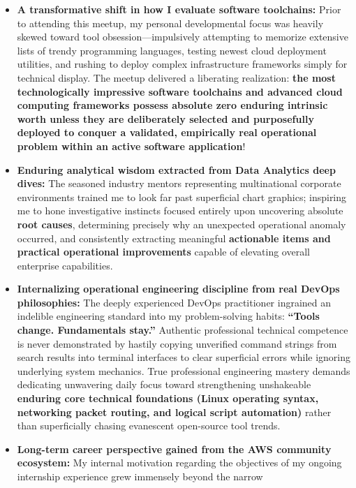 \begin{itemize}
\tightlist
\item
  \textbf{A transformative shift in how I evaluate software toolchains:}
  Prior to attending this meetup, my personal developmental focus was
  heavily skewed toward tool obsession---impulsively attempting to
  memorize extensive lists of trendy programming languages, testing
  newest cloud deployment utilities, and rushing to deploy complex
  infrastructure frameworks simply for technical display. The meetup
  delivered a liberating realization: \textbf{the most technologically
  impressive software toolchains and advanced cloud computing frameworks
  possess absolute zero enduring intrinsic worth unless they are
  deliberately selected and purposefully deployed to conquer a
  validated, empirically real operational problem within an active
  software application}!
\item
  \textbf{Enduring analytical wisdom extracted from Data Analytics deep
  dives:} The seasoned industry mentors representing multinational
  corporate environments trained me to look far past superficial chart
  graphics; inspiring me to hone investigative instincts focused
  entirely upon uncovering absolute \textbf{root causes}, determining
  precisely why an unexpected operational anomaly occurred, and
  consistently extracting meaningful \textbf{actionable items and
  practical operational improvements} capable of elevating overall
  enterprise capabilities.
\item
  \textbf{Internalizing operational engineering discipline from real
  DevOps philosophies:} The deeply experienced DevOps practitioner
  ingrained an indelible engineering standard into my problem-solving
  habits: \textbf{``Tools change. Fundamentals stay.''} Authentic
  professional technical competence is never demonstrated by hastily
  copying unverified command strings from search results into terminal
  interfaces to clear superficial errors while ignoring underlying
  system mechanics. True professional engineering mastery demands
  dedicating unwavering daily focus toward strengthening unshakeable
  \textbf{enduring core technical foundations (Linux operating syntax,
  networking packet routing, and logical script automation)} rather than
  superficially chasing evanescent open-source tool trends.
\item
  \textbf{Long-term career perspective gained from the AWS community
  ecosystem:} My internal motivation regarding the objectives of my
  ongoing internship experience grew immensely beyond the narrow

\end{itemize}
